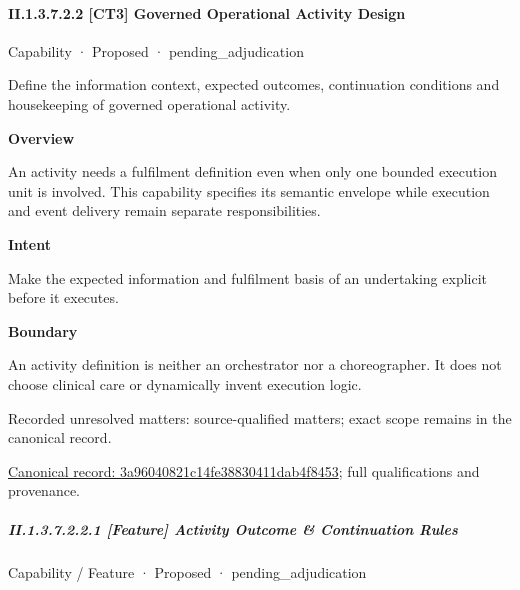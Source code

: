 \paragraph*{II.1.3.7.2.2 [CT3] Governed Operational Activity Design}
\label{navigation:II.1.3.7.2.2}

\label{element:3a96040821c14fe38830411dab4f8453}
{\small Capability · Proposed · pending\_adjudication}\par

Define the information context, expected outcomes, continuation conditions and housekeeping of governed operational activity.



\textbf{Overview}



An activity needs a fulfilment definition even when only one bounded execution unit is involved. This capability specifies its semantic envelope while execution and event delivery remain separate responsibilities.



\textbf{Intent}



Make the expected information and fulfilment basis of an undertaking explicit before it executes.



\textbf{Boundary}



An activity definition is neither an orchestrator nor a choreographer. It does not choose clinical care or dynamically invent execution logic.


{\small Recorded unresolved matters: source-qualified matters; exact scope remains in the canonical record.}\par
{\footnotesize \href{../../../../../../../continuum/strategy/capability/3a96040821c14fe38830411dab4f8453.md}{Canonical record: 3a96040821c14fe38830411dab4f8453}; full qualifications and provenance.}\par
\subparagraph*{II.1.3.7.2.2.1 [Feature] Activity Outcome \& Continuation Rules}
\label{navigation:II.1.3.7.2.2.1}

\label{element:34c8309244c142ec8772dcbb11ecc4ef}
{\small Capability / Feature · Proposed · pending\_adjudication}\par


